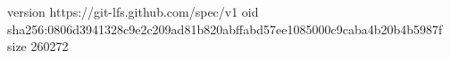 version https://git-lfs.github.com/spec/v1
oid sha256:0806d3941328c9e2c209ad81b820abffabd57ee1085000c9caba4b20b4b5987f
size 260272
